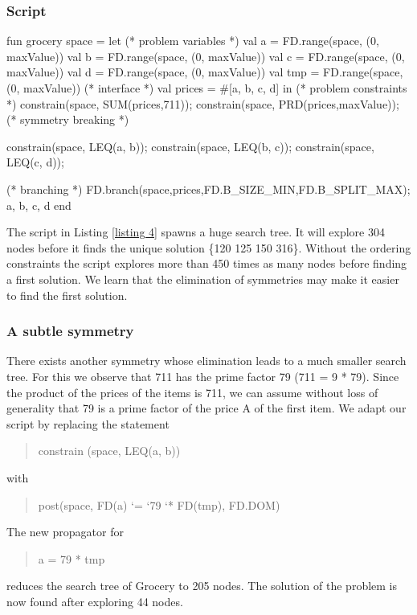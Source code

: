 \documentclass[a4paper]{scrartcl}
\begin{document}
\subsubsection{Script}
\begin{myverbatim}
fun grocery space =
   let
      (* problem variables *)
      val a = FD.range(space, (0, maxValue))
      val b = FD.range(space, (0, maxValue))
      val c = FD.range(space, (0, maxValue))
      val d = FD.range(space, (0, maxValue))
      val tmp = FD.range(space,(0, maxValue))
      (* interface *)
      val prices = #[a, b, c, d]
   in
      (* problem constraints *)
      constrain(space, SUM(prices,711));
      constrain(space, PRD(prices,maxValue));
      (* symmetry breaking *)
      
      constrain(space, LEQ(a, b));
      constrain(space, LEQ(b, c));
      constrain(space, LEQ(c, d));
      
      (* branching *)
      FD.branch(space,prices,FD.B_SIZE_MIN,FD.B_SPLIT_MAX);
      {a, b, c, d}
   end
\end{myverbatim}


The script in Listing \ref{listing 4} spawns a huge search tree. 
It will explore 
304 nodes before it finds the unique solution \{120 125 150 316\}.
 Without the ordering constraints 
the script explores more than 450 times as many nodes before
 finding a first solution. 
We learn that the elimination of symmetries may make it easier 
to find the first solution.


\subsubsection{A subtle symmetry}
There exists another symmetry whose elimination leads to a much smaller search tree. 
For this we observe that 711 has the prime factor 79 (711 = 9 * 79). Since the product 
of the prices of the items is 711, we can assume without loss of generality that 79 is 
a prime factor of the price A of the first item. We adapt our script by replacing 
the statement 
\begin{quote}
constrain (space, LEQ(a, b)) 
\end{quote}
with
\begin{quote}
post(space, FD(a) `=  `79  `*  FD(tmp), FD.DOM)
\end{quote}
The new propagator for 
\begin{quote}
a = 79 * tmp
\end{quote} 
reduces the search tree of Grocery to 205 nodes. 
The solution of the problem is now found after exploring 44 nodes.
\end{document}
